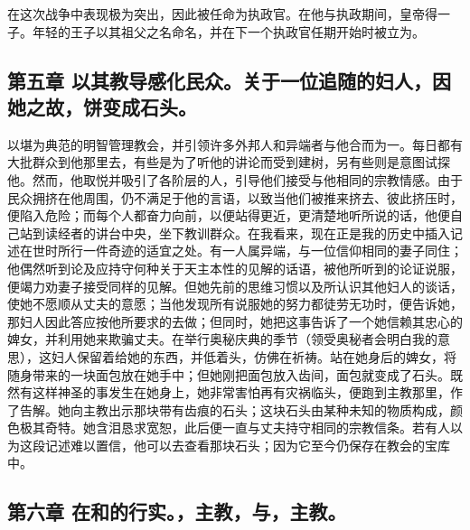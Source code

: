 在这次战争中表现极为突出，因此被任命为执政官。在他与执政期间，皇帝得一子。年轻的王子以其祖父之名命名，并在下一个执政官任期开始时被立为。\par


\subsection{第五章 以其教导感化民众。关于一位追随的妇人，因她之故，饼变成石头。}

以堪为典范的明智管理教会，并引领许多外邦人和异端者与他合而为一。每日都有大批群众到他那里去，有些是为了听他的讲论而受到建树，另有些则是意图试探他。然而，他取悦并吸引了各阶层的人，引导他们接受与他相同的宗教情感。由于民众拥挤在他周围，仍不满足于他的言语，以致当他们被推来挤去、彼此挤压时，便陷入危险；而每个人都奋力向前，以便站得更近，更清楚地听所说的话，他便自己站到读经者的讲台中央，坐下教训群众。在我看来，现在正是我的历史中插入记述在世时所行一件奇迹的适宜之处。有一人属异端，与一位信仰相同的妻子同住；他偶然听到论及应持守何种关于天主本性的见解的话语，被他所听到的论证说服，便竭力劝妻子接受同样的见解。但她先前的思维习惯以及所认识其他妇人的谈话，使她不愿顺从丈夫的意愿；当他发现所有说服她的努力都徒劳无功时，便告诉她，那妇人因此答应按他所要求的去做；但同时，她把这事告诉了一个她信赖其忠心的婢女，并利用她来欺骗丈夫。在举行奥秘庆典的季节（领受奥秘者会明白我的意思），这妇人保留着给她的东西，并低着头，仿佛在祈祷。站在她身后的婢女，将随身带来的一块面包放在她手中；但她刚把面包放入齿间，面包就变成了石头。既然有这样神圣的事发生在她身上，她非常害怕再有灾祸临头，便跑到主教那里，作了告解。她向主教出示那块带有齿痕的石头；这块石头由某种未知的物质构成，颜色极其奇特。她含泪恳求宽恕，此后便一直与丈夫持守相同的宗教信条。若有人以为这段记述难以置信，他可以去查看那块石头；因为它至今仍保存在教会的宝库中。\par


\subsection{第六章 在和的行实。，主教，与，主教。}

